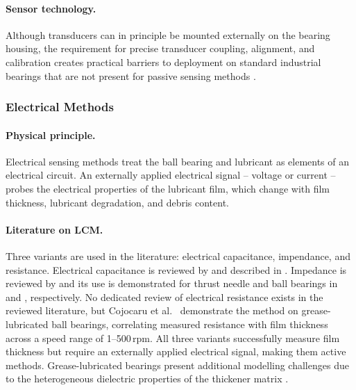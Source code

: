 \paragraph{Sensor technology.} Although transducers can in principle be mounted externally on the bearing housing, the requirement for precise transducer coupling, alignment, and calibration creates practical barriers to deployment on standard industrial bearings that are not present for passive sensing methods \cite{hansen_comparison_2022,wang_accuracy-improved_2024}.

\subsubsection{Electrical Methods}
\label{subsubsec:electrical}

\paragraph{Physical principle.} Electrical sensing methods treat the ball bearing and lubricant as elements of an electrical circuit. An externally applied electrical signal -- voltage or current -- probes the electrical properties of the lubricant film, which change with film thickness, lubricant degradation, and debris content.

\paragraph{Literature on LCM.} Three variants are used in the literature: electrical capacitance, impendance, and resistance. Electrical capacitance is reviewed by \cite{cen_ehl_2021,dai_situ_2024} and described in \cite{schneider_method_2022}. Impedance is reviewed by \cite{becker-dombrowsky_electrical_2024} and its use is demonstrated for thrust needle and ball bearings in \cite{maruyama_lubrication_2023} and \cite{maruyama_lubrication_2019}, respectively. No dedicated review of electrical resistance exists in the reviewed literature, but Cojocaru et al.\ \cite{cojocaru_grease_2025} demonstrate the method on grease-lubricated ball bearings, correlating measured resistance with film thickness across a speed range of 1--500\,rpm. All three variants successfully measure film thickness but require an externally applied electrical signal, making them active methods. Grease-lubricated bearings present additional modelling challenges due to the heterogeneous dielectric properties of the thickener matrix \cite{cojocaru_grease_2025,zhang_grease_2021}.

